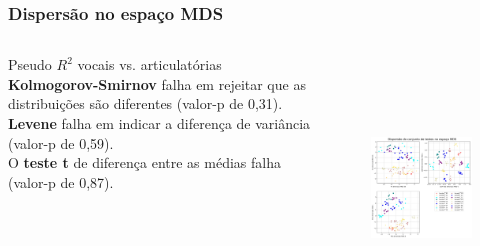 \documentclass[121pt, aspectratio=169, t]{beamer}
\begin{document}
\begin{frame}[fragile=singleslide]
	\frametitle{Dispersão no espaço MDS}
	
	\begin{columns}
		\begin{column}{0.4\textwidth}
			Pseudo $R^2$ vocais vs. articulatórias\\
			\vspace{0.5cm}
			\textbf{Kolmogorov-Smirnov} falha em rejeitar que as distribuições são diferentes (valor-p de 0,31). \\
			\vspace{0.5cm}
			\textbf{Levene} falha em indicar a diferença de variância (valor-p de 0,59). \\
			\vspace{0.5cm}
			O \textbf{teste t} de diferença entre as médias falha (valor-p de 0,87).\\
		\end{column}
		\begin{column}{0.6\textwidth}  %
			\vspace{-1cm}
			\begin{figure}
				\centering
				\includegraphics[height=7cm]{MDS_01.jpg}
			\end{figure}
		\end{column}
		
	\end{columns}
\end{frame}
\end{document}
